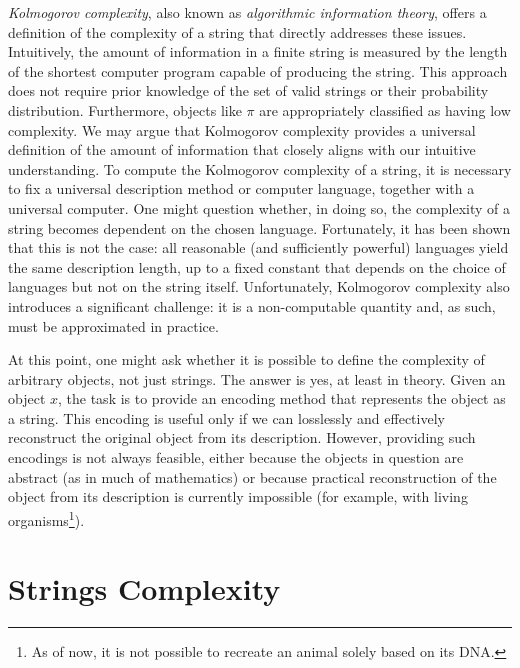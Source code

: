 \emph{Kolmogorov complexity}, also known as \emph{algorithmic information theory}, offers a definition of the complexity of a string that directly addresses these issues. Intuitively, the amount of information in a finite string is measured by the length of the shortest computer program capable of producing the string. This approach does not require prior knowledge of the set of valid strings or their probability distribution. Furthermore, objects like $\pi$ are appropriately classified as having low complexity. We may argue that Kolmogorov complexity provides a universal definition of the amount of information that closely aligns with our intuitive understanding. To compute the Kolmogorov complexity of a string, it is necessary to fix a universal description method or computer language, together with a universal computer. One might question whether, in doing so, the complexity of a string becomes dependent on the chosen language. Fortunately, it has been shown that this is not the case: all reasonable (and sufficiently powerful) languages yield the same description length, up to a fixed constant that depends on the choice of languages but not on the string itself. Unfortunately, Kolmogorov complexity also introduces a significant challenge: it is a non-computable quantity and, as such, must be approximated in practice.

At this point, one might ask whether it is possible to define the complexity of arbitrary objects, not just strings. The answer is yes, at least in theory. Given an object $x$, the task is to provide an encoding method that represents the object as a string. This encoding is useful only if we can losslessly and effectively reconstruct the original object from its description. However, providing such encodings is not always feasible, either because the objects in question are abstract (as in much of mathematics) or because practical reconstruction of the object from its description is currently impossible (for example, with living organisms\footnote{As of now, it is not possible to recreate an animal solely based on its DNA.}).

%
%

\section{Strings Complexity}
\label{sec:strings_complexity}

